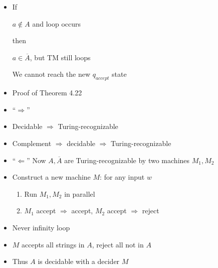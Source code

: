 \begin{frame}[allowframebreaks]
\begin{itemize}
\item If
  \begin{center}
  $a \notin A$ and loop occurs
\end{center}
then
\begin{center}
$a \in \overline{A}$, but TM still loops
\end{center}
We cannot reach the new $q_{accept}$ state

\item Proof of Theorem 4.22
\item ``$\Rightarrow$''

\item [] Decidable $\Rightarrow$ Turing-recognizable

\item [] Complement $\Rightarrow$ decidable $\Rightarrow$
Turing-recognizable

\item ``$\Leftarrow$'' Now  $A,\overline{A}$ are Turing-recognizable
  by two machines $M_1, M_2$
\item Construct a new machine $M$: for any input $w$
\begin{enumerate}
\item Run $M_1,M_2$ in parallel
\item $M_1$ accept $\Rightarrow$ accept, 
$M_2$ accept $\Rightarrow$ reject
\end{enumerate}
\item Never infinity loop

\item $M$ accepts all strings in $A$, reject all not in $A$

\item Thus $A$ is decidable with a decider $M$
\end{itemize}\end{frame}


